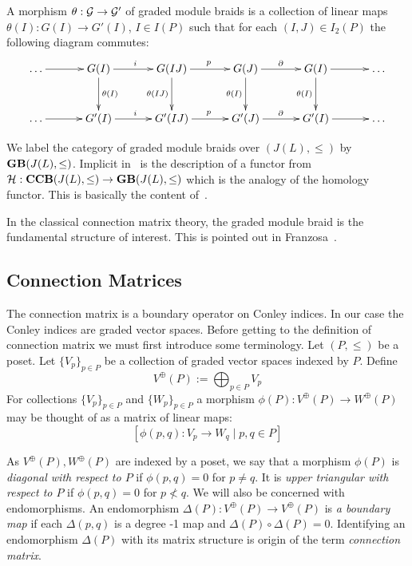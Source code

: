 A morphism $\theta:{\mathcal G}\to {\mathcal G}'$ of graded module braids is a collection of linear maps $\theta(I):G(I)\to G'(I)$, $I\in I(P)$ such that for each $(I,J)\in I_2(P)$ the following diagram commutes:
\[
\xymatrixrowsep{0.4in}
\xymatrixcolsep{0.45in}
\xymatrix{
\ldots \ar@{->}[r] & G(I) \ar@{->}[d]^{\theta(I)} \ar@{->}[r]^{i} & G(IJ) \ar@{->}[d]_{\theta(IJ)} \ar@{->}[r]^{p} & G(J) \ar@{->}[d]_{\theta(I)} \ar@{->}[r]^{\partial} & G(I) \ar@{->}[d]_{\theta(I)} \ar@{->}[r] & \ldots\\
\ldots \ar@{->}[r] & G'(I) \ar@{->}[r]^{i} & G'(IJ) \ar@{->}[r]^{p} & G'(J) \ar@{->}[r]^{\partial} & G'(I) \ar@{->}[r] &\ldots
}
\]

We label the category of graded module braids over $(J(L),\leq)$ by ${\bf GB}(J(L),\leq)$.  Implicit in~\cite{fran} is the description of a functor from ${\mathcal H}:{\bf CCB}(J(L),\leq)\to {\bf GB}(J(L),\leq)$ which is the analogy of the homology functor.  This is basically the content of~\cite[Proposition 2.7]{fran}.


\begin{rem}
In the classical connection matrix theory, the graded module braid is the fundamental structure of interest.  This is pointed out in Franzosa~\cite{}.  
\end{rem}


\subsection{Connection Matrices}

The connection matrix is a boundary operator on Conley indices.  In our case the Conley indices are graded vector spaces.  Before getting to the definition of connection matrix we must first introduce some terminology.  Let $(P,\leq)$ be a poset.  Let $\{V_p\}_{p\in P}$ be a collection of graded vector spaces indexed by $P$.  Define $$V^\oplus(P) := \bigoplus_{p\in P} V_p$$  For collections $\{V_p\}_{p\in P}$ and $\{W_p\}_{p\in P}$ a morphism $\phi(P):V^\oplus(P)\to W^\oplus(P)$ may be thought of as a matrix of linear maps: $$[\phi(p,q):V_p\to W_q\mid p,q\in P]$$


As $V^\oplus(P),W^\oplus(P)$ are indexed by a poset, we say that a morphism $\phi(P)$ is {\em diagonal with respect to $P$} if $\phi(p,q)=0$ for $p\neq q$.  It is {\em upper triangular with respect to $P$} if $\phi(p,q)=0$ for $p\nless q$.  We will also be concerned with endomorphisms.  An endomorphism $\Delta(P):V^\oplus(P)\to V^\oplus(P)$ is {\em a boundary map} if each $\Delta(p,q)$ is a degree -1 map and $\Delta(P)\circ \Delta(P) = 0$.  Identifying an endomorphism $\Delta(P)$ with its matrix structure is origin of the term {\em connection matrix}.  

